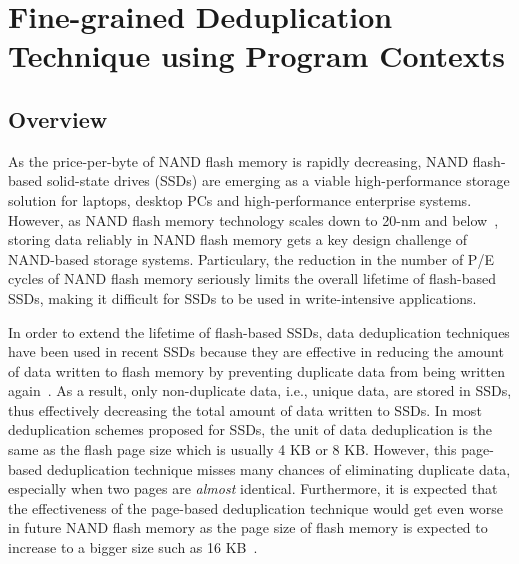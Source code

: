 \chapter{Fine-grained Deduplication Technique using Program Contexts} 
\label{chap:FineDedup}

\section{Overview}
As the price-per-byte of NAND flash memory is rapidly decreasing,
NAND flash-based solid-state drives (SSDs) are emerging as a viable high-performance storage solution
for laptops, desktop PCs and high-performance enterprise systems.
However, as NAND flash memory technology scales down to 20-nm and below~\cite{tlc}, storing data reliably in NAND flash memory
gets a key design challenge of NAND-based storage systems. 
Particulary, the reduction in the number of P/E cycles of NAND flash memory seriously limits the overall lifetime of flash-based SSDs,
making it difficult for SSDs to be used in write-intensive applications.

In order to extend the lifetime of flash-based SSDs,
data deduplication techniques have been used in recent SSDs
because they are effective in reducing the amount of data written to flash memory by preventing duplicate data 
from being written again~\cite{caftl,value-locality}.
As a result, only non-duplicate data, i.e., unique data, are stored in SSDs, thus effectively decreasing the total amount of data written to
SSDs.
In most deduplication schemes proposed for SSDs,
the unit of data deduplication is the same as the flash page size which is usually 4 KB or 8 KB.
However, this page-based deduplication technique misses many chances of eliminating duplicate data, especially
when two pages are \textit{almost} identical.
Furthermore, it is expected that the effectiveness of the page-based deduplication technique would 
get even worse in future NAND flash memory as the page size of 
flash memory is expected to increase
to a bigger size such as 16 KB~\cite{16kpage}.

